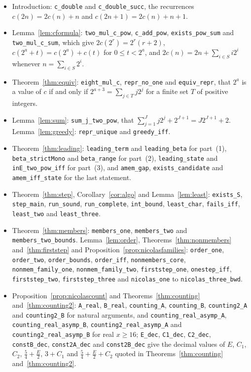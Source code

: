 \documentclass[11pt]{amsart}
\theoremstyle{definition}
\begin{document}
\begin{itemize}
\item Introduction: \texttt{c\_double} and \texttt{c\_double\_succ}, the recurrences $c(2n)=2c(n)+n$ and $c(2n+1)=2c(n)+n+1$.
\item Lemma~\ref{lem:cformula}: \texttt{two\_mul\_c\_pow}, \texttt{c\_add\_pow}, \texttt{exists\_pow\_sum} and \texttt{two\_mul\_c\_sum}, which give $2c(2^r)=2^r(r+2)$, $c(2^a+t)=c(2^a)+c(t)$ for $0\le t<2^a$, and $2c(n)=2n+\sum_{i\in S}i2^i$ whenever $n=\sum_{i\in S}2^i$.
\item Theorem~\ref{thm:equiv}: \texttt{eight\_mul\_c}, \texttt{repr\_no\_one} and \texttt{equiv\_repr}, that $2^a$ is a value of $c$ if and only if $2^{a+3}=\sum_{j\in T}j2^j$ for a finite set $T$ of positive integers.
\item Lemma~\ref{lem:sum}: \texttt{sum\_j\_two\_pow}, that $\sum_{j=1}^{J}j2^j+2^{J+1}=J2^{J+1}+2$. Lemma~\ref{lem:greedy}: \texttt{repr\_unique} and \texttt{greedy\_iff}.
\item Theorem~\ref{thm:leading}: \texttt{leading\_term} and \texttt{leading\_beta} for part~(1), \texttt{beta\_strictMono} and \texttt{beta\_range} for part~(2), \texttt{leading\_state} and \texttt{inE\_two\_pow\_iff} for part~(3), and \texttt{amem\_gap}, \texttt{exists\_candidate} and \texttt{amem\_iff\_state} for the last statement.
\item Theorem~\ref{thm:step}, Corollary~\ref{cor:algo} and Lemma~\ref{lem:least}: \texttt{exists\_S}, \texttt{step\_main}, \texttt{run\_sound}, \texttt{run\_complete}, \texttt{int\_bound}, \texttt{least\_char}, \texttt{fails\_iff}, \texttt{least\_two} and \texttt{least\_three}.
\item Theorem~\ref{thm:members}: \texttt{members\_one}, \texttt{members\_two} and \texttt{members\_two\_bounds}. Lemma~\ref{lem:order}, Theorems~\ref{thm:nonmembers} and~\ref{thm:firststep} and Proposition~\ref{prop:nicolasfamilies}: \texttt{order\_one}, \texttt{order\_two}, \texttt{order\_bounds}, \texttt{order\_iff}, \texttt{nonmembers\_core}, \texttt{nonmem\_family\_one}, \texttt{nonmem\_family\_two}, \texttt{firststep\_one}, \texttt{onestep\_iff}, \texttt{firststep\_two}, \texttt{firststep\_three} and \texttt{nicolas\_one} to \texttt{nicolas\_three\_bwd}.
\item Proposition~\ref{prop:nicolascount} and Theorems~\ref{thm:counting} and~\ref{thm:counting2}: \texttt{A\_real}, \texttt{B\_real}, \texttt{counting\_A}, \texttt{counting\_B}, \texttt{counting2\_A} and \texttt{counting2\_B} for natural arguments, and \texttt{counting\_real\_asymp\_A}, \texttt{counting\_real\_asymp\_B}, \texttt{counting2\_real\_asymp\_A} and \texttt{counting2\_real\_asymp\_B} for real $x\ge16$; \texttt{E\_dec}, \texttt{C1\_dec}, \texttt{C2\_dec}, \texttt{constB\_dec}, \texttt{const2A\_dec} and \texttt{const2B\_dec} give the decimal values of $E$, $C_1$, $C_2$, $\frac54+\frac E2$, $3+C_1$ and $\frac54+\frac E2+C_2$ quoted in Theorems~\ref{thm:counting} and~\ref{thm:counting2}.

\end{itemize}
\end{document}
